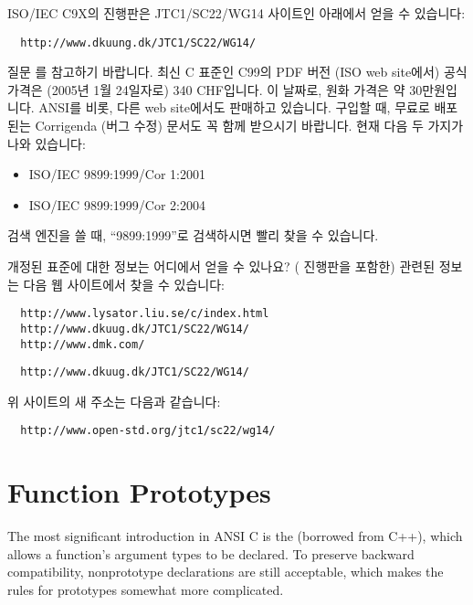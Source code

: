 \begin{faq}
	ISO/IEC C9X의 진행판은 JTC1/SC22/WG14 사이트인 아래에서 얻을 수
        있습니다:
\begin{verbatim}
  http://www.dkuung.dk/JTC1/SC22/WG14/
\end{verbatim}
	질문 를 참고하기 바랍니다.
\T
	최신 C 표준인 C99의 PDF 버전 (ISO web site에서) 공식 가격은
        (2005년 1월 24일자로) 340 CHF입니다. 이 날짜로, 원화 가격은 약
        30만원입니다. ANSI를 비롯, 다른 web site에서도
        판매하고 있습니다.  구입할 때, 무료로 배포된는 Corrigenda (버그 수정)
        문서도 꼭 함께 받으시기 바랍니다. 현재 다음 두 가지가 나와 있습니다:
        \begin{itemize}
          \item ISO/IEC 9899:1999/Cor 1:2001
          \item ISO/IEC 9899:1999/Cor 2:2004
        \end{itemize}
        \noindent 검색 엔진을 쓸 때, ``9899:1999''로 검색하시면 빨리 찾을
        수 있습니다. 

\end{faq}

\begin{faq}
	개정된 표준에 대한 정보는 어디에서 얻을 수 있나요?
\A
	(\cite{c9x} 진행판을 포함한) 관련된 정보는 다음 웹 사이트에서 찾을 수
	있습니다:
\begin{verbatim}
  http://www.lysator.liu.se/c/index.html
  http://www.dkuug.dk/JTC1/SC22/WG14/
  http://www.dmk.com/
\end{verbatim}

\T
\begin{verbatim}
  http://www.dkuug.dk/JTC1/SC22/WG14/
\end{verbatim}
	\noindent 위 사이트의 새 주소는 다음과 같습니다:
\begin{verbatim}
  http://www.open-std.org/jtc1/sc22/wg14/
\end{verbatim}
\end{faq}

\section{Function Prototypes}
The most significant introduction in ANSI C is the 
(borrowed from C++), which allows a function's argument types to be declared.
To preserve backward compatibility, nonprototype declarations are still
acceptable, which makes the rules for prototypes somewhat more complicated.

